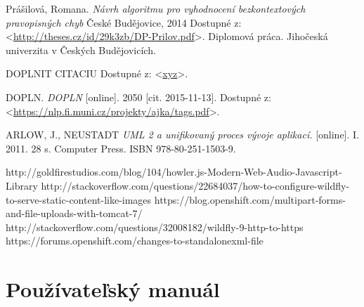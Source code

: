 \documentclass[12pt,oneside]{fithesis2}
\begin{document}
\begin{thebibliography}{59}
  		Prášilová, Romana.
  		\emph{Návrh algoritmu pro vyhodnocení bezkontextových pravopisných chyb}
  		České Budějovice, 
  		2014
  		Dostupné z: <\url{http://theses.cz/id/29k3zb/DP-Prilov.pdf}>.
  		Diplomová práca. Jihočeská univerzita v Českých Budějovicích.
  		
		DOPLNIT CITACIU
  		Dostupné z: <\url{xyz}>.
  		
  		DOPLN.
  		\emph{DOPLN}
  		[online].
  		2050
  		[cit. 2015-11-13].
  		Dostupné z: <\url{https://nlp.fi.muni.cz/projekty/ajka/tags.pdf}>.
  		
  		ARLOW, J., NEUSTADT
  		\emph{UML 2 a unifikovaný proces vývoje aplikací.}
  		[online].
  		I. 2011. 28 s.
		Computer Press. ISBN 978-80-251-1503-9. 
  		
  		http://goldfirestudios.com/blog/104/howler.js-Modern-Web-Audio-Javascript-Library
  		http://stackoverflow.com/questions/22684037/how-to-configure-wildfly-to-serve-static-content-like-images
  		https://blog.openshift.com/multipart-forms-and-file-uploads-with-tomcat-7/
  		http://stackoverflow.com/questions/32008182/wildfly-9-http-to-https
  		https://forums.openshift.com/changes-to-standalonexml-file
  		
  		  			
	\end{thebibliography} 
	
    \appendix
    \chapter{Používateľský manuál} 	  %
\end{document}
